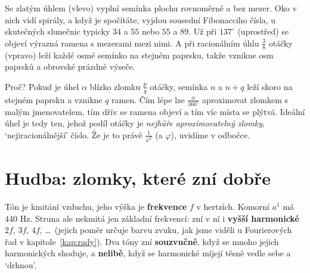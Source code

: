 Se zlatým úhlem (vlevo) vyplní semínka plochu rovnoměrně a bez mezer. Oko v nich vidí spirály, a když je spočítáte, vyjdou sousední Fibonacciho čísla, u skutečných slunečnic typicky $34$ a $55$ nebo $55$ a $89$. Už při $137^\circ$ (uprostřed) se objeví výrazná ramena s mezerami mezi nimi. A při racionálním úhlu $\frac{3}{8}$ otáčky (vpravo) leží každé osmé semínko na stejném paprsku, takže vznikne osm paprsků a obrovské prázdné výseče.

Proč? Pokud je úhel $\alpha$ blízko zlomku $\frac{p}{q}$ otáčky, semínka $n$ a $n + q$ leží skoro na stejném paprsku a vznikne $q$ ramen. Čím lépe lze $\frac{\alpha}{360^\circ}$ aproximovat zlomkem s malým jmenovatelem, tím dřív se ramena objeví a tím víc místa se plýtvá. Ideální úhel je tedy ten, jehož podíl otáčky je \textit{nejhůře aproximovatelný zlomky}, `nejiracionálnější' číslo. Že je to právě $\frac{1}{\varphi^2}$ (a $\varphi$), uvidíme v odbočce.

\section{Hudba: zlomky, které zní dobře}

Tón je kmitání vzduchu, jeho výška je \textbf{frekvence} $f$ v hertzích. Komorní $a^1$ má $440$ Hz. Struna ale nekmitá jen základní frekvencí: zní v ní i \textbf{vyšší harmonické} $2f$, $3f$, $4f$, \dots\ (jejich poměr určuje barvu zvuku, jak jsme viděli u Fourierových řad v kapitole~\ref{kap:rady}). Dva tóny zní \textbf{souzvučně}, když se mnoho jejich harmonických shoduje, a \textbf{nelibě}, když se harmonické míjejí těsně vedle sebe a `drhnou'.

\begin{center}
\end{center}

